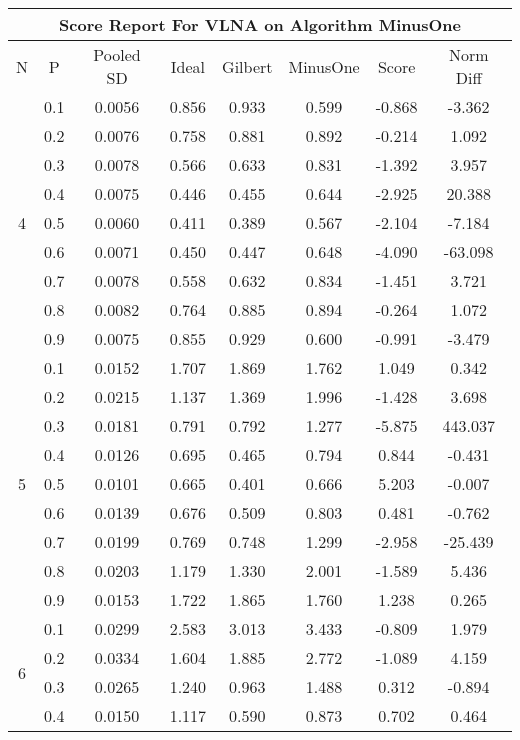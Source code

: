 \documentclass[11pt,a4paper]{report}
\begin{document}
\begin{longtable}{ | c | c || c | c | c | c | c | c | }
\hline
\multicolumn{8}{|c|}{ Score Report For VLNA on Algorithm MinusOne} \\
\hline
N & P & Pooled SD &  Ideal &  Gilbert & MinusOne  & Score & Norm Diff \\
 \hline
 \hline
 \endhead
\multirow{9}{*}{4} & 0.1 & 0.0056 & 0.856 & 0.933 & 0.599 & -0.868 & -3.362 \\
 & 0.2 & 0.0076 & 0.758 & 0.881 & 0.892 & -0.214 & 1.092 \\
 & 0.3 & 0.0078 & 0.566 & 0.633 & 0.831 & -1.392 & 3.957 \\
 & 0.4 & 0.0075 & 0.446 & 0.455 & 0.644 & -2.925 & 20.388 \\
 & 0.5 & 0.0060 & 0.411 & 0.389 & 0.567 & -2.104 & -7.184 \\
 & 0.6 & 0.0071 & 0.450 & 0.447 & 0.648 & -4.090 & -63.098 \\
 & 0.7 & 0.0078 & 0.558 & 0.632 & 0.834 & -1.451 & 3.721 \\
 & 0.8 & 0.0082 & 0.764 & 0.885 & 0.894 & -0.264 & 1.072 \\
 & 0.9 & 0.0075 & 0.855 & 0.929 & 0.600 & -0.991 & -3.479 \\
 \hline
\multirow{9}{*}{5} & 0.1 & 0.0152 & 1.707 & 1.869 & 1.762 & 1.049 & 0.342 \\
 & 0.2 & 0.0215 & 1.137 & 1.369 & 1.996 & -1.428 & 3.698 \\
 & 0.3 & 0.0181 & 0.791 & 0.792 & 1.277 & -5.875 & 443.037 \\
 & 0.4 & 0.0126 & 0.695 & 0.465 & 0.794 & 0.844 & -0.431 \\
 & 0.5 & 0.0101 & 0.665 & 0.401 & 0.666 & 5.203 & -0.007 \\
 & 0.6 & 0.0139 & 0.676 & 0.509 & 0.803 & 0.481 & -0.762 \\
 & 0.7 & 0.0199 & 0.769 & 0.748 & 1.299 & -2.958 & -25.439 \\
 & 0.8 & 0.0203 & 1.179 & 1.330 & 2.001 & -1.589 & 5.436 \\
 & 0.9 & 0.0153 & 1.722 & 1.865 & 1.760 & 1.238 & 0.265 \\
 \hline
\multirow{9}{*}{6} & 0.1 & 0.0299 & 2.583 & 3.013 & 3.433 & -0.809 & 1.979 \\
 & 0.2 & 0.0334 & 1.604 & 1.885 & 2.772 & -1.089 & 4.159 \\
 & 0.3 & 0.0265 & 1.240 & 0.963 & 1.488 & 0.312 & -0.894 \\
 & 0.4 & 0.0150 & 1.117 & 0.590 & 0.873 & 0.702 & 0.464 \\

\end{longtable}
\end{document}
